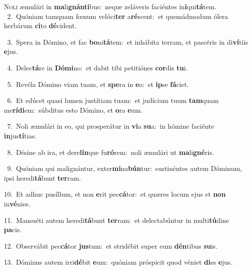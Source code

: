 \lettrine{\initial\textcolor{\initialcolor}{N}}{oli} æmulári in \textbf{ma}\-li\-\textbf{gnán}\-\textbf{ti}bus:~\star neque zeláveris faciéntes in\-\textbf{i}\-qui\-\textbf{tá}\-tem.\\
{\numbfont\textcolor{\numbcolor}{~2.}}~Quóniam tamquam fœnum velóci\textbf{ter} a\-\textbf{ré}\-scent:~\star et quemádmodum ólera herbárum \textbf{ci}\-to \textbf{dé}\-cident.\par
{\numbfont\textcolor{\numbcolor}{~3.}}~Spera in Dómino, et fac \textbf{bo}\-ni\-\textbf{tá}\-tem:~\star et inhábita terram, et pascéris in di\-\textbf{ví}\-tiis \textbf{e}\-jus.\par
{\numbfont\textcolor{\numbcolor}{~4.}}~Delec\-\textbf{tá}\-re in \textbf{Dó}\-\textbf{mi}no:~\star et dabit tibi petitiónes \textbf{cor}\-dis \textbf{tu}\-i.\par
{\numbfont\textcolor{\numbcolor}{~5.}}~Revéla Dómino viam tuam, et \textbf{spe}\-ra in \textbf{e}\-o:~\star et \textbf{ip}\-se \textbf{fá}\-ciet.\par
{\numbfont\textcolor{\numbcolor}{~6.}}~Et edúcet quasi lumen justítiam tuam:~\dagger et judícium tuum \textbf{tam}\-quam me\-\textbf{rí}\-\textbf{di}em:~\star súbditus esto Dómino, et \textbf{o}\-ra \textbf{e}\-um.\par
{\numbfont\textcolor{\numbcolor}{~7.}}~Noli æmulári in eo, qui prosperátur in \textbf{vi}\-a \textbf{su}\-a:~\star in hómine faciénte \textbf{in}\-jus\-\textbf{tí}\-tias.\par
{\numbfont\textcolor{\numbcolor}{~8.}}~Désine ab ira, et dere\-\textbf{lín}\-que fu\-\textbf{ró}\-rem:~\star noli æmulári ut \textbf{ma}\-li\-\textbf{gné}\-ris.\par
{\numbfont\textcolor{\numbcolor}{~9.}}~Quóniam qui malignántur, exter\-\textbf{mi}\-na\-\textbf{bún}\-tur:~\star sustinéntes autem Dóminum, ipsi heredi\-\textbf{tá}\-bunt \textbf{ter}\-ram.\par
{\numbfont\textcolor{\numbcolor}{10.}}~Et adhuc pusíllum, et non \textbf{e}\-rit pec\-\textbf{cá}\-tor:~\star et quæres locum ejus et \textbf{non} in\-\textbf{vé}\-nies.\par
{\numbfont\textcolor{\numbcolor}{11.}}~Mansuéti autem heredi\-\textbf{tá}\-bunt \textbf{ter}\-ram:~\star et delectabúntur in multi\-\textbf{tú}\-dine \textbf{pa}\-cis.\par
{\numbfont\textcolor{\numbcolor}{12.}}~Observábit pec\-\textbf{cá}\-tor \textbf{jus}\-tum:~\star et stridébit super eum \textbf{dén}\-tibus \textbf{su}\-is.\par
{\numbfont\textcolor{\numbcolor}{13.}}~Dóminus autem irri\-\textbf{dé}\-bit \textbf{e}\-um:~\star quóniam próspicit quod véniet \textbf{di}\-es \textbf{e}\-jus.\par
